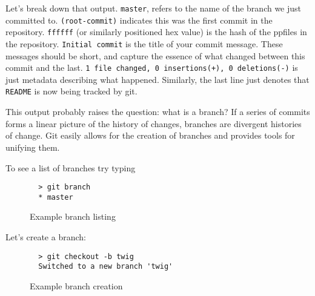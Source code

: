 \documentclass[11pt]{report}
\begin{document}
    
    
    
    


Let's break down that output. \texttt{master}, refers to the name of the branch
we just committed to. \texttt{(root-commit)} indicates this was the first commit
in the repository. \texttt{ffffff} (or similarly positioned hex value) is the
hash of the ppfiles in the repository. \texttt{Initial commit} is the title of your
commit message. These messages should be short, and capture the essence of what
changed between this commit and the last. \texttt{1 file changed, 0 insertions(+),
0 deletions(-)} is just metadata describing what happened. Similarly, the last line
just denotes that \texttt{README} is now being tracked by git.

This output probably raises the question: what is a branch?
If a series of commits forms a linear picture of the history of changes,
branches are divergent histories of change. Git easily allows for the creation of
branches and provides tools for unifying them.

To see a list of branches try typing 
\begin{figure}[H]
  \caption{Example branch listing}
  \begin{lstlisting}
  > git branch
  * master
  \end{lstlisting}
 \end{figure}

Let's create a branch:
\begin{figure}[H]
  \caption{Example branch creation}
  \begin{lstlisting}
  > git checkout -b twig
  Switched to a new branch 'twig'
  \end{lstlisting}
\end{figure}
\end{document}
